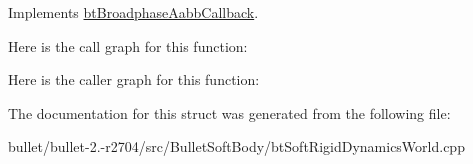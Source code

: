 Implements \hyperlink{structbt_broadphase_aabb_callback}{bt\+Broadphase\+Aabb\+Callback}.



Here is the call graph for this function\+:




Here is the caller graph for this function\+:




The documentation for this struct was generated from the following file\+:\begin{DoxyCompactItemize}
\item 
bullet/bullet-\/2.-\/r2704/src/\+Bullet\+Soft\+Body/bt\+Soft\+Rigid\+Dynamics\+World.\+cpp\end{DoxyCompactItemize}
